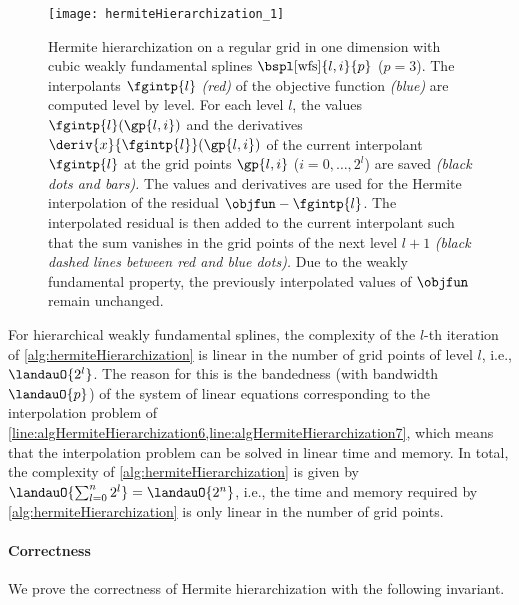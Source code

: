 \begin{SCfigure}
  \texttt{[image: hermiteHierarchization\_1]}%
  \caption[%
    Hermite hierarchization%
  ]{%
    Hermite hierarchization on a regular grid in one dimension
    with cubic weakly fundamental splines $\bspl[\wfs]{l,i}{p}$ ($p = 3$).
    The interpolants $\fgintp{l}$ \emph{\textcolor{C1}{(red)}}
    of the objective function \emph{\textcolor{C0}{(blue)}}
    are computed level by level.
    For each level $l$,
    the values $\fgintp{l}(\gp{l,i})$ and the derivatives
    $\deriv{x}{\fgintp{l}}(\gp{l,i})$ of the
    current interpolant $\fgintp{l}$ at the
    grid points $\gp{l,i}$ ($i = 0, \dotsc, 2^l$) are saved
    \emph{(black dots and bars).}
    The values and derivatives are used for the Hermite interpolation
    of the residual $\objfun - \fgintp{l}$.
    The interpolated residual is then added to the current interpolant
    such that the sum vanishes in the grid points of the next level $l + 1$
    \emph{%
      (black dashed lines between \textcolor{C1}{red} and
      \textcolor{C0}{blue} dots).%
    }
    Due to the weakly fundamental property, the previously
    interpolated values of $\objfun$ remain unchanged.%
  }%
  \label{fig:hermiteHierarchization}%
\end{SCfigure}

For hierarchical weakly fundamental splines,
the complexity of the $l$-th iteration of \cref{alg:hermiteHierarchization}
is linear in the number of grid points of level $l$, i.e., $\landauO{2^l}$.
The reason for this is the bandedness (with bandwidth $\landauO{p}$) of the
system of linear equations corresponding to the interpolation problem of
\cref{line:algHermiteHierarchization6,line:algHermiteHierarchization7},
which means that the interpolation problem can be solved in
linear time and memory.
In total, the complexity of \cref{alg:hermiteHierarchization} is
given by $\landauO{\sum_{l=0}^n 2^l} = \landauO{2^n}$, i.e.,
the time and memory required by \cref{alg:hermiteHierarchization}
is only linear in the number of grid points.

\paragraph{Correctness}

We prove the correctness of Hermite hierarchization
with the following invariant.

